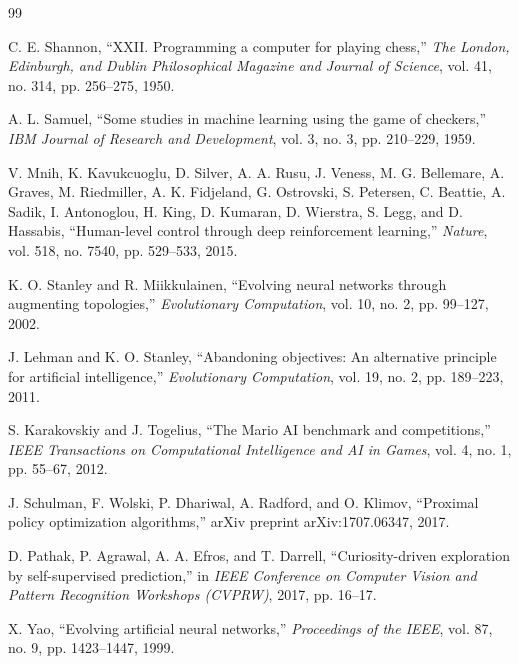 
\clearpage
{}
{}

\begin{thebibliography}{99}

C. E. Shannon, ``XXII. Programming a computer for playing chess,''
\emph{The London, Edinburgh, and Dublin Philosophical Magazine and Journal of
Science}, vol. 41, no. 314, pp. 256--275, 1950.

A. L. Samuel, ``Some studies in machine learning using the game of checkers,''
\emph{IBM Journal of Research and Development}, vol. 3, no. 3, pp. 210--229,
1959.

V. Mnih, K. Kavukcuoglu, D. Silver, A. A. Rusu, J. Veness, M. G. Bellemare,
A. Graves, M. Riedmiller, A. K. Fidjeland, G. Ostrovski, S. Petersen,
C. Beattie, A. Sadik, I. Antonoglou, H. King, D. Kumaran, D. Wierstra,
S. Legg, and D. Hassabis, ``Human-level control through deep reinforcement
learning,'' \emph{Nature}, vol. 518, no. 7540, pp. 529--533, 2015.

K. O. Stanley and R. Miikkulainen, ``Evolving neural networks through
augmenting topologies,'' \emph{Evolutionary Computation}, vol. 10, no. 2,
pp. 99--127, 2002.

J. Lehman and K. O. Stanley, ``Abandoning objectives: An alternative principle
for artificial intelligence,'' \emph{Evolutionary Computation}, vol. 19,
no. 2, pp. 189--223, 2011.

S. Karakovskiy and J. Togelius, ``The Mario AI benchmark and competitions,''
\emph{IEEE Transactions on Computational Intelligence and AI in Games},
vol. 4, no. 1, pp. 55--67, 2012.

J. Schulman, F. Wolski, P. Dhariwal, A. Radford, and O. Klimov, ``Proximal
policy optimization algorithms,'' arXiv preprint arXiv:1707.06347, 2017.

D. Pathak, P. Agrawal, A. A. Efros, and T. Darrell, ``Curiosity-driven
exploration by self-supervised prediction,'' in \emph{IEEE Conference on
Computer Vision and Pattern Recognition Workshops (CVPRW)}, 2017, pp. 16--17.

X. Yao, ``Evolving artificial neural networks,'' \emph{Proceedings of the
IEEE}, vol. 87, no. 9, pp. 1423--1447, 1999.


\end{thebibliography}
